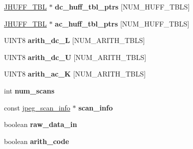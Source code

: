 \begin{DoxyCompactItemize}
\hyperlink{struct_j_h_u_f_f___t_b_l}{J\+H\+U\+F\+F\+\_\+\+T\+BL} $\ast$ {\bfseries dc\+\_\+huff\+\_\+tbl\+\_\+ptrs} \mbox{[}N\+U\+M\+\_\+\+H\+U\+F\+F\+\_\+\+T\+B\+LS\mbox{]}
\item 
\mbox{\label{structjpeg__compress__struct_aee32db8740389ecb5e83255bd7f27ca9}} 
\hyperlink{struct_j_h_u_f_f___t_b_l}{J\+H\+U\+F\+F\+\_\+\+T\+BL} $\ast$ {\bfseries ac\+\_\+huff\+\_\+tbl\+\_\+ptrs} \mbox{[}N\+U\+M\+\_\+\+H\+U\+F\+F\+\_\+\+T\+B\+LS\mbox{]}
\item 
\mbox{\label{structjpeg__compress__struct_a8d26a9f37579758d24616cda2c8b4b05}} 
U\+I\+N\+T8 {\bfseries arith\+\_\+dc\+\_\+L} \mbox{[}N\+U\+M\+\_\+\+A\+R\+I\+T\+H\+\_\+\+T\+B\+LS\mbox{]}
\item 
\mbox{\label{structjpeg__compress__struct_a76c4942c3130cf8481d55c54191ef9f7}} 
U\+I\+N\+T8 {\bfseries arith\+\_\+dc\+\_\+U} \mbox{[}N\+U\+M\+\_\+\+A\+R\+I\+T\+H\+\_\+\+T\+B\+LS\mbox{]}
\item 
\mbox{\label{structjpeg__compress__struct_ab20a02c95fb17c1ccf3adf3027489890}} 
U\+I\+N\+T8 {\bfseries arith\+\_\+ac\+\_\+K} \mbox{[}N\+U\+M\+\_\+\+A\+R\+I\+T\+H\+\_\+\+T\+B\+LS\mbox{]}
\item 
\mbox{\label{structjpeg__compress__struct_ab35b7325732cfb92dad59211e86da413}} 
int {\bfseries num\+\_\+scans}
\item 
\mbox{\label{structjpeg__compress__struct_a53766f81cf4975db492f89f982e7aee4}} 
const \hyperlink{structjpeg__scan__info}{jpeg\+\_\+scan\+\_\+info} $\ast$ {\bfseries scan\+\_\+info}
\item 
\mbox{\label{structjpeg__compress__struct_a6272ef214ca4c41636f48a089c4e2f88}} 
boolean {\bfseries raw\+\_\+data\+\_\+in}
\item 
\mbox{\label{structjpeg__compress__struct_a50af15b7b855a6e14f630ccefc0432bf}} 
boolean {\bfseries arith\+\_\+code}
\item 
\mbox{\label{structjpeg__compress__struct_af7eaf46080d592d39d2f08fff191c822}} 

\end{DoxyCompactItemize}
